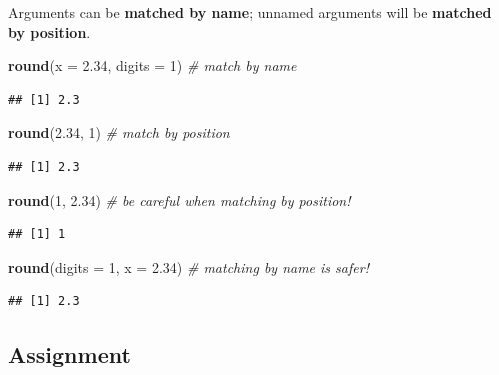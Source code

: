 \documentclass[
]{book}
\newenvironment{Shaded}{\begin{snugshade}}{\end{snugshade}}
\newcommand{\CommentTok}[1]{\textcolor[rgb]{0.56,0.35,0.01}{\textit{#1}}}
\newcommand{\DataTypeTok}[1]{\textcolor[rgb]{0.13,0.29,0.53}{#1}}
\newcommand{\DecValTok}[1]{\textcolor[rgb]{0.00,0.00,0.81}{#1}}
\newcommand{\FloatTok}[1]{\textcolor[rgb]{0.00,0.00,0.81}{#1}}
\newcommand{\KeywordTok}[1]{\textcolor[rgb]{0.13,0.29,0.53}{\textbf{#1}}}
\newcommand{\NormalTok}[1]{#1}
\begin{document}
Arguments can be \textbf{matched by name}; unnamed arguments will be \textbf{matched by position}.

\begin{Shaded}
\begin{Highlighting}[]
\KeywordTok{round}\NormalTok{(}\DataTypeTok{x =} \FloatTok{2.34}\NormalTok{, }\DataTypeTok{digits =} \DecValTok{1}\NormalTok{) }\CommentTok{\# match by name}
\end{Highlighting}
\end{Shaded}

\begin{verbatim}
## [1] 2.3
\end{verbatim}

\begin{Shaded}
\begin{Highlighting}[]
\KeywordTok{round}\NormalTok{(}\FloatTok{2.34}\NormalTok{, }\DecValTok{1}\NormalTok{) }\CommentTok{\# match by position}
\end{Highlighting}
\end{Shaded}

\begin{verbatim}
## [1] 2.3
\end{verbatim}

\begin{Shaded}
\begin{Highlighting}[]
\KeywordTok{round}\NormalTok{(}\DecValTok{1}\NormalTok{, }\FloatTok{2.34}\NormalTok{) }\CommentTok{\# be careful when matching by position!}
\end{Highlighting}
\end{Shaded}

\begin{verbatim}
## [1] 1
\end{verbatim}

\begin{Shaded}
\begin{Highlighting}[]
\KeywordTok{round}\NormalTok{(}\DataTypeTok{digits =} \DecValTok{1}\NormalTok{, }\DataTypeTok{x =} \FloatTok{2.34}\NormalTok{) }\CommentTok{\# matching by name is safer!}
\end{Highlighting}
\end{Shaded}

\begin{verbatim}
## [1] 2.3
\end{verbatim}

\hypertarget{assignment}{%
\subsection{Assignment}\label{assignment}}
\end{document}
